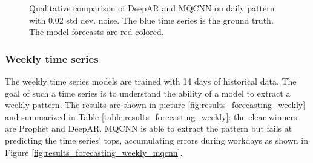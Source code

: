 \documentclass[a4paper, 12pt]{article} %
\begin{document}
	\begin{figure}\centering
		 \hfill
		
		\caption{Qualitative comparison of DeepAR and MQCNN on daily pattern with 0.02 std dev. noise. The blue time series is the ground truth. The model forecasts are red-colored.}
		\label{fig:results_forecasting_daily_02_mqcnn_deepar}
	\end{figure}
	
	\clearpage
	\subsubsection{Weekly time series} \label{sssec:results_forecasting_weekly}
	The weekly time series models are trained with 14 days of historical data. The goal of such a time series is to understand the ability of a model to extract a weekly pattern.
	The results are shown in picture \ref{fig:results_forecasting_weekly} and summarized in Table \ref{table:results_forecasting_weekly}: the clear winners are Prophet and DeepAR. MQCNN is able to extract the pattern but fails at predicting the time series' tops, accumulating errors during workdays as shown in Figure \ref{fig:results_forecasting_weekly_mqcnn}.
	
\end{document}
